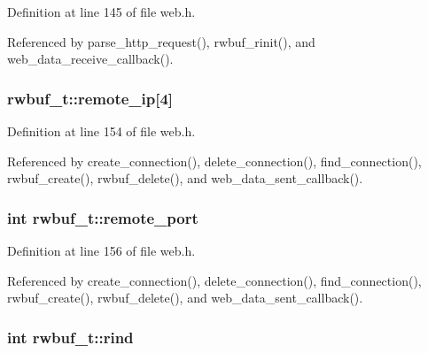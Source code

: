 Definition at line 145 of file web.\+h.



Referenced by parse\+\_\+http\+\_\+request(), rwbuf\+\_\+rinit(), and web\+\_\+data\+\_\+receive\+\_\+callback().

\subsubsection[{\texorpdfstring{remote\+\_\+ip}{remote_ip}}]{ rwbuf\+\_\+t\+::remote\+\_\+ip\mbox{[}4\mbox{]}}\hypertarget{structrwbuf__t_ad83926198e358ac1a569b0da7749572c}{}\label{structrwbuf__t_ad83926198e358ac1a569b0da7749572c}


Definition at line 154 of file web.\+h.



Referenced by create\+\_\+connection(), delete\+\_\+connection(), find\+\_\+connection(), rwbuf\+\_\+create(), rwbuf\+\_\+delete(), and web\+\_\+data\+\_\+sent\+\_\+callback().

\subsubsection[{\texorpdfstring{remote\+\_\+port}{remote_port}}]{\setlength{\rightskip}{0pt plus 5cm}int rwbuf\+\_\+t\+::remote\+\_\+port}\hypertarget{structrwbuf__t_aace1e79a985cc8fab4c2093208bf3763}{}\label{structrwbuf__t_aace1e79a985cc8fab4c2093208bf3763}


Definition at line 156 of file web.\+h.



Referenced by create\+\_\+connection(), delete\+\_\+connection(), find\+\_\+connection(), rwbuf\+\_\+create(), rwbuf\+\_\+delete(), and web\+\_\+data\+\_\+sent\+\_\+callback().

\subsubsection[{\texorpdfstring{rind}{rind}}]{\setlength{\rightskip}{0pt plus 5cm}int rwbuf\+\_\+t\+::rind}\hypertarget{structrwbuf__t_ad5cbf7a78a5f5d9aa75b38f90e0fb6af}{}\label{structrwbuf__t_ad5cbf7a78a5f5d9aa75b38f90e0fb6af}


